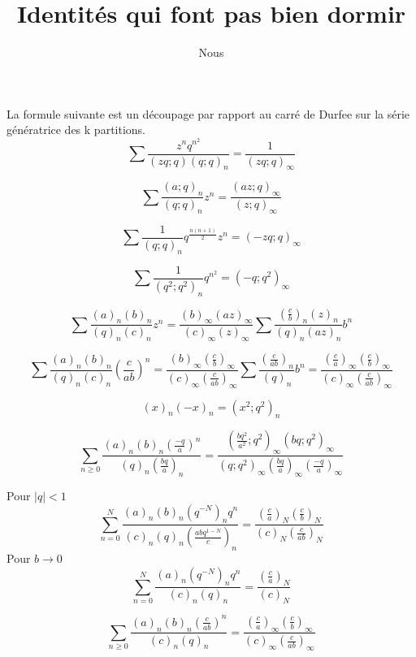 \documentclass[a4paper,11pt]{article}
\title{Identités qui font pas bien dormir}
\author{Nous}
\begin{document}
\maketitle
La formule suivante est un découpage par rapport au carré de Durfee sur la série
génératrice des k partitions.
$$\sum \frac{z^nq^{n^2}}{(zq;q)(q;q)_n}=\frac{1}{(zq;q)_\infty}$$

$$\sum \frac{(a;q)_n}{(q;q)_n}z^n=\frac{(az;q)_\infty}{(z;q)_\infty}$$

$$\sum \frac{1}{(q;q)_n}q^{\frac{n(n+1)}{2}}z^n=(-zq;q)_\infty$$

$$\sum \frac{1}{(q^2;q^2)_n}q^{n^2}=(-q;q^2)_\infty$$


$$\sum
\frac{(a)_n(b)_n}{(q)_n(c)_n}z^n=
\frac{(b)_\infty(az)_\infty}{(c)_\infty(z)_\infty}
\sum \frac{(\frac{c}{b})_n(z)_n}{(q)_n(az)_n}b^n$$

$$\sum
\frac{(a)_n(b)_n}{(q)_n(c)_n}(\frac{c}{ab})^n=
\frac{(b)_\infty(\frac{c}{b})_\infty}{(c)_\infty(\frac{c}{ab})_\infty}
\sum
\frac{(\frac{c}{ab})_n}{(q)_n}b^n=\frac{(\frac{c}{a})_\infty(\frac{c}{b})_\infty}{(c)_\infty
(\frac{c}{ab})_\infty}$$

$$(x)_n(-x)_n=(x^2;q^2)_n $$

$$
\sum_{n \geq 0}
\frac{(a)_n (b)_n (\frac{-q}{a})^n}{(q)_n (\frac{bq}{a})_n} = 
\frac{(\frac{bq^2}{a^2};q^2)_\infty (bq;q^2)_\infty}{(q;q^2)_\infty (\frac{bq}{a})_\infty (\frac{-q}{a})_\infty}
$$

Pour $|q| < 1$
$$
\sum_{n=0}^N
\frac{(a)_n (b)_n (q^{-N})_n q^n}{(c)_n(q)_n(\frac{abq^{1-N}}{c})_n} =
\frac{(\frac{c}{a})_N (\frac{c}{b})_N}{(c)_N (\frac{c}{ab})_N}
$$
Pour $b\rightarrow 0$
$$
\sum_{n=0}^N
\frac{(a)_n (q^{-N})_n q^n}{(c)_n(q)_n} =
\frac{(\frac{c}{a})_N}{(c)_N}
$$


$$
\sum_{n \geq 0}
\frac{(a)_n (b)_n (\frac{c}{ab})^n}{(c)_n(q)_n} =
\frac{(\frac{c}{a})_\infty (\frac{c}{b})_\infty}{(c)_\infty (\frac{c}{ab})_\infty}
$$
\end{document}
